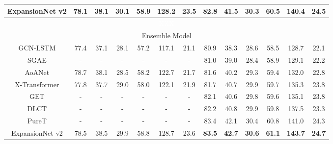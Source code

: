 \begin{table*}[htb!]
\begin{tabular}{| c | c  c  c  c  c  c | c  c  c  c  c  c  |}
 \Xhline{1.5\arrayrulewidth}
 ExpansionNet v2 & 78.1 & 38.1 & 30.1 & 58.9 & 128.2 & 23.5 & \textbf{82.8} & \textbf{41.5} & \textbf{30.3} & \textbf{60.5} & \textbf{140.4} & \textbf{24.5} \\
 \hline
 \multicolumn{13}{c}{\textcolor{white}{XXX}}\\
 \hline
 \multicolumn{13}{|c|}{Ensemble Model}\\
 \hline
 GCN-LSTM \cite{yao2018exploring} & 77.4 & 37.1 & 28.1 & 57.2 & 117.1 & 21.1 & 80.9 & 38.3 & 28.6 & 58.5 & 128.7 & 22.1\\
 \hline
 SGAE \cite{yang2019auto} & - & - & - & - & - & - & 81.0 & 39.0 & 28.4 & 58.9 & 129.1 & 22.2\\
 \hline
 AoANet \cite{huang2019attention} & 78.7 & 38.1 & 28.5 & 58.2 & 122.7 & 21.7 & 81.6 & 40.2 & 29.3 & 59.4 & 132.0 & 22.8\\
 \hline
 X-Transformer \cite{pan2020x} & 77.8 & 37.7 & 29.0 & 58.0 & 122.1 & 21.9 & 81.7 & 40.7 & 29.9 & 59.7 & 135.3 & 23.8 \\
 \hline
 GET \cite{ji2021improving} & - & - & - & - & - & - & 82.1 & 40.6 & 29.8 & 59.6 & 135.1 & 23.8 \\
 \hline
 DLCT \cite{luo2021dual} & - & - & - & - & - & - & 82.2 & 40.8 & 29.9 & 59.8 & 137.5 & 23.3 \\
\hline
 PureT \cite{wang2022end} & - & - & - & - & - & - & 83.4 & 42.1 & 30.4 & 60.8 & 141.0 & 24.3 \\
 \Xhline{1.5\arrayrulewidth}
 ExpansionNet v2  & 78.5 & 38.5 & 29.9 & 58.8 & 128.7 & 23.6 & \textbf{83.5} & \textbf{42.7} & \textbf{30.6} & \textbf{61.1} & \textbf{143.7} & \textbf{24.7} \\
 \hline
 
 \end{tabular}
  \label{tab:offline_table_eval}
\end{table*} 

